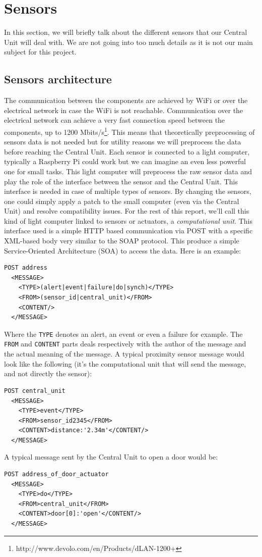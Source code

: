 \documentclass{acm_proc_article-sp}
\begin{document}
\section{Sensors}
In this section, we will briefly talk about the different sensors that our Central Unit will deal with. 
We are not going into too much details as it is not our main subject for this project.
\subsection{Sensors architecture}
The communication between the components are achieved by WiFi or over the electrical network in case the WiFi is not reachable. 
Communication over the electrical network can achieve a very fast connection speed between the components, up to 1200 Mbits/s\footnote{http://www.devolo.com/en/Products/dLAN-1200+}. 
This means that theoretically preprocessing of sensors data is not needed but for utility reasons we will preprocess the data before reaching the Central Unit.
Each sensor is connected to a light computer, typically a Raspberry Pi could work but we can imagine an even less powerful one for small tasks. 
This light computer will preprocess the raw sensor data and play the role of the interface between the sensor and the Central Unit. 
This interface is needed in case of multiple types of sensors. By changing the sensors, one could simply apply a patch to the small computer (even via the Central Unit) and resolve compatibility issues. For the rest of this report, we'll call this kind of light computer linked to sensors or actuators, a \textit{computational unit}.
This interface used is a simple HTTP based communication via POST with a specific XML-based body very similar to the SOAP protocol. 
This produce a simple Service-Oriented Architecture (SOA) to access the data. 
Here is an example:
\begin{verbatim}
POST address 
  <MESSAGE>
    <TYPE>(alert|event|failure|do|synch)</TYPE>
    <FROM>(sensor_id|central_unit)</FROM>
    <CONTENT/>
  </MESSAGE>
\end{verbatim}
Where the \texttt{TYPE} denotes an alert, an event or even a failure for example. 
The \texttt{FROM} and \texttt{CONTENT} parts deals respectively with the author of the message and the actual meaning of the message. 
A typical proximity sensor message would look like the following (it's the computational unit that will send the message, and not directly the sensor):
\begin{verbatim}
POST central_unit 
  <MESSAGE>
    <TYPE>event</TYPE>
    <FROM>sensor_id2345</FROM>
    <CONTENT>distance:'2.34m'</CONTENT/>
  </MESSAGE>
\end{verbatim}
A typical message sent by the Central Unit to open a door would be:
\begin{verbatim}
POST address_of_door_actuator
  <MESSAGE>
    <TYPE>do</TYPE>
    <FROM>central_unit</FROM>
    <CONTENT>door[0]:'open'</CONTENT/>
  </MESSAGE> 
\end{verbatim}
\end{document}
